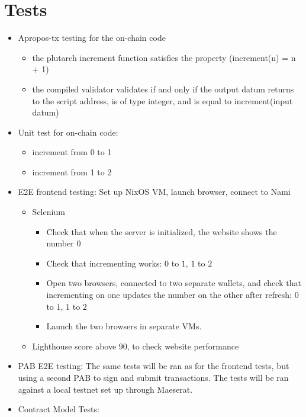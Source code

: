 \documentclass{article}
\begin{document}
\section{Tests}

\begin{itemize}
  \item Apropos-tx testing for the on-chain code
  \begin{itemize}
    \item the plutarch increment function satisfies the property (increment(n) = n + 1)
    \item the compiled validator validates if and only if the output datum returns to the script address, is of type integer, and is equal to increment(input datum)
  \end{itemize}
  \item Unit test for on-chain code:
  \begin{itemize}
    \item increment from 0 to 1
    \item increment from 1 to 2
  \end{itemize}
  \item E2E frontend testing: Set up NixOS VM, launch browser, connect to Nami
  \begin{itemize}
    \item Selenium
      \begin{itemize}
        \item Check that when the server is initialized, the website shows the
          number $0$
        \item Check that incrementing works: $0$ to $1$, $1$ to $2$
        \item Open two browsers, connected to two separate wallets, and check
          that incrementing on one updates the number on the other after
          refresh: $0$ to $1$, $1$ to $2$
        \item Launch the two browsers in separate VMs.
      \end{itemize}
    \item Lighthouse score above $90$, to check website performance
  \end{itemize}
  \item PAB E2E testing: The same tests will be ran as for the frontend tests,
    but using a second PAB to sign and submit transactions.
    The tests will be ran against a local testnet set up through Maeserat.
  \item Contract Model Tests:

\end{itemize}
\end{document}
